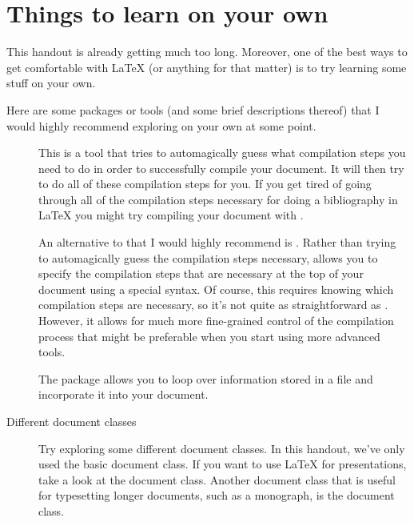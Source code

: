 
\section{Things to learn on your own}
\label{sec:things-to-learn-on-your-own}

This handout is already getting much too long.
Moreover, one of the best ways to get comfortable with \LaTeX{} (or anything for that matter) is to try learning some stuff on your own.

Here are some packages or tools (and some brief descriptions thereof) that I would highly recommend exploring on your own at some point.

\begin{description}

	\item[]{%
		This is a tool that tries to automagically guess what compilation steps you need to do in order to successfully compile your document.
		It will then try to do all of these compilation steps for you.
		If you get tired of going through all of the compilation steps necessary for doing a bibliography in \LaTeX{} you might try compiling your document with \href{https://www.ctan.org/pkg/latexmk}{}.%
	}
	
	\item[]{%
		An alternative to  that I would highly recommend is \href{https://www.ctan.org/pkg/arara}{}.
		Rather than trying to automagically guess the compilation steps necessary,  allows you to specify the compilation steps that are necessary at the top of your document using a special syntax.
		Of course, this requires knowing which compilation steps are necessary, so it's not quite as straightforward as .
		However, it allows for much more fine-grained control of the compilation process that might be preferable when you start using more advanced tools.%
	}
	
	\item[]{%
		The \href{https://www.ctan.org/pkg/datatool}{} package allows you to loop over information stored in a  file and incorporate it into your  document.%
	}
	
	\item[Different document classes]{%
		Try exploring some different document classes.
		In this handout, we've only used the basic  document class.
		If you want to use \LaTeX{} for presentations, take a look at the \href{https://ctan.org/pkg/beamer}{} document class.
		Another document class that is useful for typesetting longer documents, such as a monograph, is the \href{https://ctan.org/pkg/memoir}{} document class.%
	}
	

\end{description}
